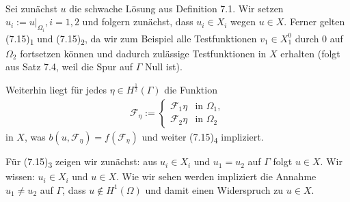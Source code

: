 \\
Sei zunächst $u$ die schwache Lösung aus Definition 7.1.
Wir setzen $u_i:=u|_{\Omega_i},i=1,2$ und folgern zunächst, dass $u_i\in X_i$ wegen $u\in X$.
Ferner gelten (7.15)\textsubscript{1} und (7.15)\textsubscript{2}, da wir zum Beispiel alle Testfunktionen $v_1\in X_1^0$ durch 0 auf $\Omega_2$ fortsetzen können und dadurch zulässige Testfunktionen in $X$ erhalten (folgt aus Satz 7.4, weil die Spur auf $\Gamma$ Null ist).

Weiterhin liegt für jedes $\eta\in H^{\frac{1}{2}}(\Gamma)$ die Funktion
\begin{align}
\mathcal{F}_\eta := \left\{\begin{array}{lc} \mathcal{F}_1\eta & \text{in }\Omega_1,\\ \mathcal{F}_2\eta & \text{in } \Omega_2 \end{array}\right.
\end{align}
in $X$, was $b(u,\mathcal{F}_\eta) = f(\mathcal{F}_\eta)$ und weiter (7.15)\textsubscript{4} impliziert.

Für (7.15)\textsubscript{3} zeigen wir zunächst: aus $u_i\in X_i$ und $u_1=u_2$ auf $\Gamma$ folgt $u\in X$.
Wir wissen: $u_i\in X_i$ und $u\in X$.
Wie wir sehen werden impliziert die Annahme $u_1\neq u_2$ auf $\Gamma$, dass $u\notin H^1(\Omega)$ und damit einen Widerspruch zu $u\in X$.

